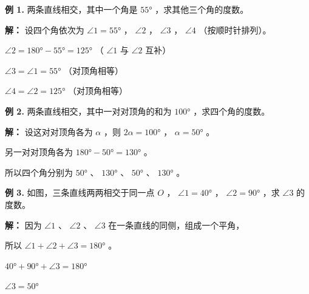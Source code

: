 \begin{workedexamples}


\textbf{例 1.} 两条直线相交，其中一个角是 $55°$ ，求其他三个角的度数。

\textbf{解：}
设四个角依次为 $\angle 1 = 55°$ ， $\angle 2$ ， $\angle 3$ ， $\angle 4$ （按顺时针排列）。

$\angle 2 = 180° - 55° = 125°$ （ $\angle 1$ 与 $\angle 2$ 互补）

$\angle 3 = \angle 1 = 55°$ （对顶角相等）

$\angle 4 = \angle 2 = 125°$ （对顶角相等）

\textbf{例 2.} 两条直线相交，其中一对对顶角的和为 $100°$ ，求四个角的度数。

\textbf{解：}
设这对对顶角各为 $\alpha$ ，则 $2\alpha = 100°$ ， $\alpha = 50°$ 。

另一对对顶角各为 $180° - 50° = 130°$ 。

所以四个角分别为 $50°$ 、 $130°$ 、 $50°$ 、 $130°$ 。

\textbf{例 3.} 如图，三条直线两两相交于同一点 $O$ ， $\angle 1 = 40°$ ， $\angle 2 = 90°$ ，求 $\angle 3$ 的度数。

\begin{center}
\label{fig:three-lines-intersect}
\end{center}


\textbf{解：}
因为 $\angle 1$ 、 $\angle 2$ 、 $\angle 3$ 在一条直线的同侧，组成一个平角，

所以 $\angle 1 + \angle 2 + \angle 3 = 180°$ 。

$40° + 90° + \angle 3 = 180°$

$\angle 3 = 50°$

\end{workedexamples}

